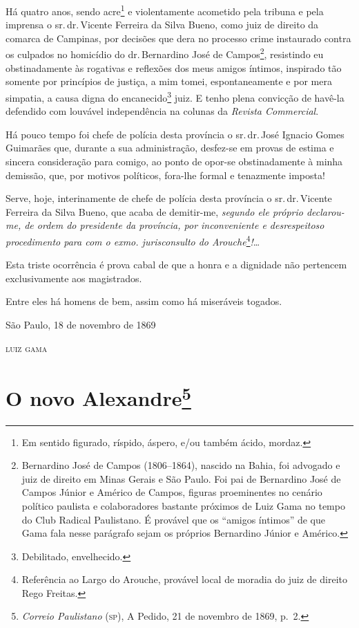 Há quatro anos, sendo acre\footnote{Em sentido figurado, ríspido,
  áspero, e/ou também ácido, mordaz.} e violentamente acometido pela
tribuna e pela imprensa o sr.\,dr.\,Vicente Ferreira da Silva Bueno, como
juiz de direito da comarca de Campinas, por decisões que dera no
processo crime instaurado contra os culpados no homicídio do dr.\,Bernardino José de Campos\footnote{Bernardino José de Campos
  (1806--1864), nascido na Bahia, foi advogado e juiz de direito em Minas
  Gerais e São Paulo. Foi pai de Bernardino José de Campos Júnior e
  Américo de Campos, figuras proeminentes no cenário político paulista e
  colaboradores bastante próximos de Luiz Gama no tempo do Club Radical
  Paulistano. É provável que os ``amigos íntimos'' de que Gama fala nesse
  parágrafo sejam os próprios Bernardino Júnior e Américo.}, resistindo
eu obstinadamente às rogativas e reflexões dos meus amigos íntimos,
inspirado tão somente por princípios de justiça, a mim tomei,
espontaneamente e por mera simpatia, a causa digna do
encanecido\footnote{Debilitado, envelhecido.} juiz. E tenho plena
convicção de havê-la defendido com louvável independência na colunas da
\emph{Revista Commercial}.

Há pouco tempo foi chefe de polícia desta província o sr.\,dr.\,José
Ignacio Gomes Guimarães que, durante a sua administração, desfez-se em
provas de estima e sincera consideração para comigo, ao ponto de opor-se
obstinadamente à minha demissão, que, por motivos políticos, fora-lhe
formal e tenazmente imposta!

Serve, hoje, interinamente de chefe de polícia desta província o sr.\,dr.\,Vicente Ferreira da Silva Bueno, que acaba de demitir-me, \emph{segundo
ele próprio declarou-me, de ordem do presidente da província, por
inconveniente e desrespeitoso procedimento para com o exmo.
jurisconsulto do Arouche}\footnote{Referência ao Largo do Arouche,
  provável local de moradia do juiz de direito Rego Freitas.}\emph{!}\ldots{}

Esta triste ocorrência é prova cabal de que a honra e a dignidade não
pertencem exclusivamente aos magistrados.

Entre eles há homens de bem, assim como há miseráveis togados.

\begin{flushright}
São Paulo, 18 de novembro de 1869

\textsc{luiz gama}
\end{flushright}

\chapter{O novo Alexandre\footnote{\emph{Correio Paulistano} (\textsc{sp}), A
  Pedido, 21 de novembro de 1869, p.~2.}}

